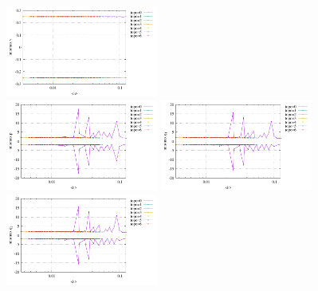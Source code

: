 \begin{center}
\includegraphics[width=5cm]{python_codes/fieldstone_78/results/stats_v_exp7.pdf}\\
\includegraphics[width=5cm]{python_codes/fieldstone_78/results/stats_p_exp7.pdf}
\includegraphics[width=5cm]{python_codes/fieldstone_78/results/stats_q1_exp7.pdf}
\includegraphics[width=5cm]{python_codes/fieldstone_78/results/stats_q2_exp7.pdf}
\end{center}

